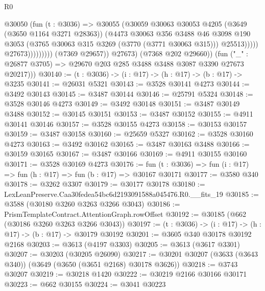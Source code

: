 \begin{lexlean}{R0}
\begin{coremodule}
                                  @30050
                                    (fun (t : @3036) =>
                                    @30055
                                      (@30059
                                        @30063
                                        @30053
                                        @4205
                                        (@3649 (@3650 @1164 @3271 @28363))
                                        (@4473
                                          @30063
                                          @356
                                          @3488
                                          @46
                                          @3098
                                          @190
                                          @3053
                                          (@3765 @30063 @315 @3269 (@3770 (@3771 @30063 @315)))
                                          @25513)))))
                                @27673)))))))))
              (@7369 @29657))
            @27673)
          (@7368 @202 @29660))
        (fun ("_" : @26877 @3705) => @29670 @203 @285 @3488 @3488 @3087 @3390 @27673 @20217)))
@30140 := (t : @3036) -> (i : @17) -> (h : @17) -> (b : @17) -> @3235
@30141 := @26031 @5321
@30143 := @3528 @30141 @4273
@30144 := @3492 @30143
@30145 := @3487 @30144
@30146 := @25791 @5324
@30148 := @3528 @30146 @4273
@30149 := @3492 @30148
@30151 := @3487 @30149 @3488
@30152 := @30145 @30151
@30153 := @3487 @30152
@30155 := @4911 @30141 @30146
@30157 := @3528 @30155 @4273
@30158 := @30153 @30157
@30159 := @3487 @30158
@30160 := @25659 @5327
@30162 := @3528 @30160 @4273
@30163 := @3492 @30162
@30165 := @3487 @30163 @3488
@30166 := @30159 @30165
@30167 := @3487 @30166
@30169 := @4911 @30155 @30160
@30171 := @3528 @30169 @4273
@30176 := fun (t : @3036) => fun (i : @17) => fun (h : @17) => fun (b : @17) => @30167 @30171
@30177 := @3580 @340
@30178 := @3262 @3307
@30179 := @30177 @30178
@30180 := LexLeanPreserve.Caa30fedea54bc6d2193091588a045476.R0.__fits_19
@30185 := @3588 (@30180 @3260 @3263 @3266 @3043)
@30186 := PrismTemplateContract.AttentionGraph.rowOffset
@30192 := @30185 (@662 (@30186 @3260 @3263 @3266 @3043))
@30197 := (t : @3036) -> (i : @17) -> (h : @17) -> (b : @17) -> @30179 @30192
@30201 := @3605 @340 @30178 @30192 @2168
@30203 := @3613 (@4197 @3303)
@30205 := @3613 (@3617 @3301)
@30207 := @30203 (@30205 @26090)
@30217 := @30201 @30207 (@3633 (@3643 @340)) (@3649 (@3650 (@3651 @2168) @30178 @3626))
@30218 := @3743 @30207
@30219 := @30218 @1420
@30222 := @30219 @2166 @30166 @30171
@30223 := @662 @30155
@30224 := @3041 @30223

\end{coremodule}
\end{lexlean}
